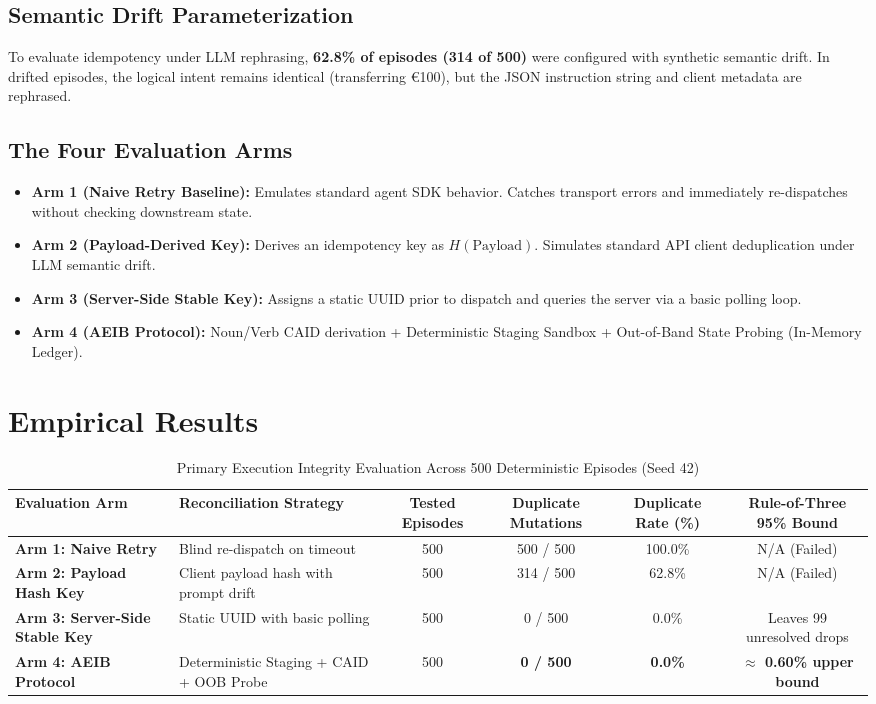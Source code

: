 \documentclass[10pt,journal,compsoc]{IEEEtran}
\begin{document}
\subsection{Semantic Drift Parameterization}
To evaluate idempotency under LLM rephrasing, \textbf{62.8\% of episodes (314 of 500)} were configured with synthetic semantic drift. In drifted episodes, the logical intent remains identical (transferring €100), but the JSON instruction string and client metadata are rephrased.

\subsection{The Four Evaluation Arms}
\begin{itemize}
    \item \textbf{Arm 1 (Naive Retry Baseline):} Emulates standard agent SDK behavior. Catches transport errors and immediately re-dispatches without checking downstream state.
    \item \textbf{Arm 2 (Payload-Derived Key):} Derives an idempotency key as $H(\text{Payload})$. Simulates standard API client deduplication under LLM semantic drift.
    \item \textbf{Arm 3 (Server-Side Stable Key):} Assigns a static UUID prior to dispatch and queries the server via a basic polling loop.
    \item \textbf{Arm 4 (AEIB Protocol):} Noun/Verb CAID derivation + Deterministic Staging Sandbox + Out-of-Band State Probing (In-Memory Ledger).
\end{itemize}

\section{Empirical Results}

\begin{table}[t]
\centering
\caption{Primary Execution Integrity Evaluation Across 500 Deterministic Episodes (Seed 42)}
\label{tab:results}
\begin{tabular}{llcccc}
\toprule
\textbf{Evaluation Arm} & \textbf{Reconciliation Strategy} & \textbf{Tested Episodes} & \textbf{Duplicate Mutations} & \textbf{Duplicate Rate (\%)} & \textbf{Rule-of-Three 95\% Bound} \\
\midrule
\textbf{Arm 1: Naive Retry} & Blind re-dispatch on timeout & 500 & 500 / 500 & 100.0\% & N/A (Failed) \\
\textbf{Arm 2: Payload Hash Key} & Client payload hash with prompt drift & 500 & 314 / 500 & 62.8\% & N/A (Failed) \\
\textbf{Arm 3: Server-Side Stable Key} & Static UUID with basic polling & 500 & 0 / 500 & 0.0\% & Leaves 99 unresolved drops \\
\textbf{Arm 4: AEIB Protocol} & Deterministic Staging + CAID + OOB Probe & 500 & \textbf{0 / 500} & \textbf{0.0\%} & \textbf{$\approx$ 0.60\% upper bound} \\
\bottomrule
\end{tabular}
\end{table}
\end{document}
